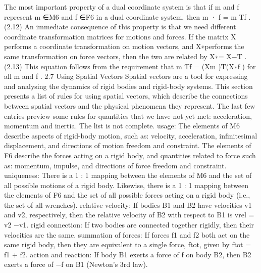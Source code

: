 The most important property of a dual coordinate system is that if m and f represent m ∈M6 and f ∈F6 in a dual coordinate system, then m · f = m Tf . (2.12) An immediate consequence of this property is that we need different coordinate transformation matrices for motions and forces. If the matrix X performs a coordinate transformation on motion vectors, and X∗performs the same transformation on force vectors, then the two are related by X∗= X−T . (2.13) This equation follows from the requirement that m Tf = (Xm )T(X∗f ) for all m and f . 2.7 Using Spatial Vectors Spatial vectors are a tool for expressing and analysing the dynamics of rigid bodies and rigid-body systems. This section presents a list of rules for using spatial vectors, which describe the connections between spatial vectors and the physical phenomena they represent. The last few entries preview some rules for quantities that we have not yet met: acceleration, momentum and inertia. The list is not complete. usage: The elements of M6 describe aspects of rigid-body motion, such as: velocity, acceleration, infinitesimal displacement, and directions of motion freedom and constraint. The elements of F6 describe the forces acting on a rigid body, and quantities related to force such as: momentum, impulse, and directions of force freedom and constraint. uniqueness: There is a 1 : 1 mapping between the elements of M6 and the set of all possible motions of a rigid body. Likewise, there is a 1 : 1 mapping between the elements of F6 and the set of all possible forces acting on a rigid body (i.e., the set of all wrenches). relative velocity: If bodies B1 and B2 have velocities v1 and v2, respectively, then the relative velocity of B2 with respect to B1 is vrel = v2 −v1. rigid connection: If two bodies are connected together rigidly, then their velocities are the same. summation of forces: If forces f1 and f2 both act on the same rigid body, then they are equivalent to a single force, ftot, given by ftot = f1 + f2. action and reaction: If body B1 exerts a force of f on body B2, then B2 exerts a force of −f on B1 (Newton’s 3rd law).

